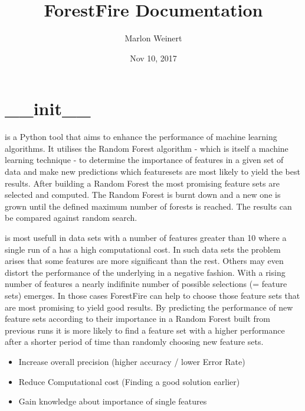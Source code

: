 \documentclass[letterpaper,10pt,english]{sphinxmanual}
\title{ForestFire Documentation}
\date{Nov 10, 2017}
\author{Marlon Weinert}
\begin{document}
\maketitle
\sphinxtableofcontents
{}\label{\detokenize{index::doc}}



\chapter{\_\_init\_\_}
\label{\detokenize{index:init}}\label{\detokenize{index:module-ForestFire}}\label{\detokenize{index:forestfire}}
 is a Python tool that aims to enhance the performance of machine learning algorithms. 
It utilises the Random Forest algorithm - which is itself a machine learning technique - to determine the 
importance of features in a given set of data and make new predictions which featuresets are most 
likely to yield the best results. 
After building a Random Forest the most promising feature sets are selected and computed. 
The Random Forest is burnt down and a new one is grown until the defined maximum number of forests is reached.
The results can be compared against random search.

 is most usefull in data sets with a number of features greater than 10 where a single run of
a {\hyperref[\detokenize{Overview:mla}]{}} has a high computational cost. In such data sets the problem arises that some features are
more significant than the rest.
Others may even distort the performance of the underlying {\hyperref[\detokenize{Overview:mla}]{}} in a negative fashion. 
With a rising number of features a nearly indifinite number of possible selections (= feature sets) emerges.
In those cases ForestFire can help to choose those feature sets that are most promising to yield good results.
By predicting the performance of new feature sets according to their importance in a Random Forest built 
from previous runs it is more likely to find a feature set with a higher performance after a shorter period 
of time than randomly choosing new feature sets.

\begin{itemize}
\item {} 
Increase overall precision (higher accuracy / lower Error Rate)

\item {} 
Reduce Computational cost (Finding a good solution earlier)

\item {} 
Gain knowledge about importance of single features

\end{itemize}
\end{document}
